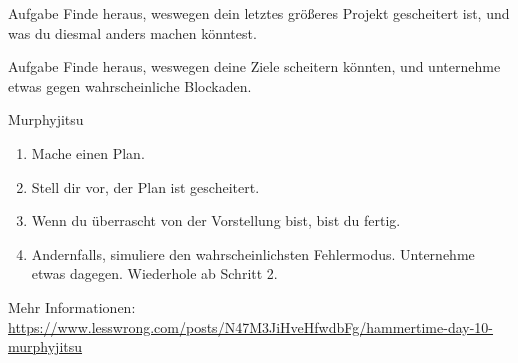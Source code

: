 \begin{frame}[c]
    \begin{block}{Aufgabe}
        Finde heraus, weswegen dein letztes größeres Projekt gescheitert ist,
        und was du diesmal anders machen könntest.
    \end{block}
\end{frame}


\begin{frame}[c]
    \begin{block}{Aufgabe}
        Finde heraus, weswegen deine Ziele scheitern könnten, und unternehme
        etwas gegen wahrscheinliche Blockaden.
    \end{block}
\end{frame}


\begin{frame}[c]{Murphyjitsu}
    \large
    \begin{enumerate}[<+(1)->]
        \item Mache einen Plan.
        \item Stell dir vor, der Plan ist gescheitert.
        \item Wenn du überrascht von der Vorstellung bist, bist du fertig.
        \item Andernfalls, simuliere den wahrscheinlichsten Fehlermodus. Unternehme etwas dagegen. Wiederhole ab Schritt 2.
    \end{enumerate}
    \pause
    \tiny
    Mehr Informationen: \url{https://www.lesswrong.com/posts/N47M3JiHveHfwdbFg/hammertime-day-10-murphyjitsu}
\end{frame}


%
%
%
%


